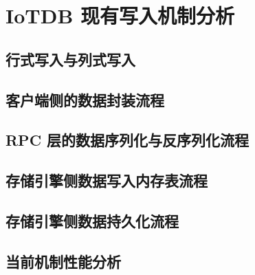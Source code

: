
\chapter{IoTDB 现有写入机制分析}
\section{行式写入与列式写入}
\section{客户端侧的数据封装流程}
\section{RPC 层的数据序列化与反序列化流程}
\section{存储引擎侧数据写入内存表流程}
\section{存储引擎侧数据持久化流程}
\section{当前机制性能分析}